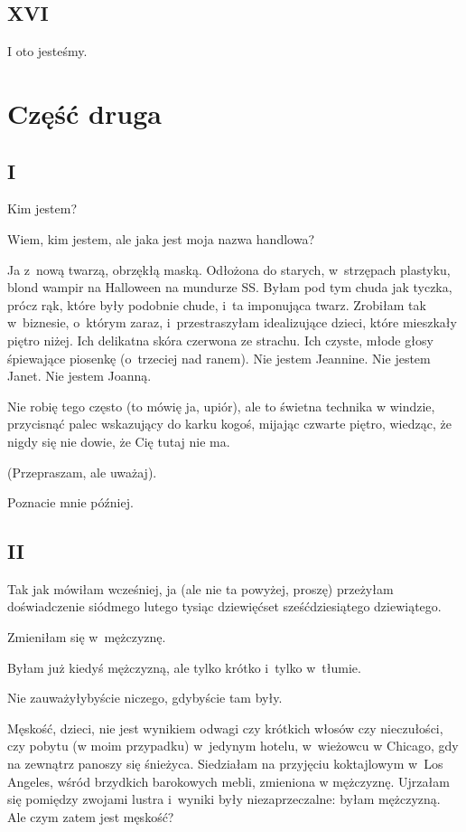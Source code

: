 \documentclass[oneside,polish,12pt,sfheadings]{mwbk}
\begin{document}
\chapter{XVI}

I oto jesteśmy.

\part*{Część druga}

\chapter{I}

Kim jestem?

Wiem, kim jestem, ale jaka jest moja nazwa handlowa?

Ja z~nową twarzą, obrzękłą maską. Odłożona do starych, w~strzępach
plastyku, blond wampir na Halloween na mundurze SS. Byłam pod tym chuda
jak tyczka, prócz rąk, które były podobnie chude, i~ta imponująca
twarz. Zrobiłam tak w~biznesie, o~którym zaraz, i~przestraszyłam idealizujące
dzieci, które mieszkały piętro niżej. Ich delikatna skóra czerwona
ze strachu. Ich czyste, młode głosy śpiewające piosenkę (o~trzeciej
nad ranem). Nie jestem Jeannine. Nie jestem Janet. Nie jestem Joanną.

Nie robię tego często (to mówię ja, upiór), ale to świetna technika
w windzie, przycisnąć palec wskazujący do karku kogoś, mijając czwarte
piętro, wiedząc, że nigdy się nie dowie, że Cię tutaj nie ma.

(Przepraszam, ale uważaj).

Poznacie mnie później.

\chapter{II}

Tak jak mówiłam wcześniej, ja (ale nie ta powyżej, proszę) przeżyłam
doświadczenie siódmego lutego tysiąc dziewięćset sześćdziesiątego
dziewiątego.

Zmieniłam się w~mężczyznę.

Byłam już kiedyś mężczyzną, ale tylko krótko i~tylko w~tłumie.

Nie zauważyłybyście niczego, gdybyście tam były.

Męskość, dzieci, nie jest wynikiem odwagi czy krótkich włosów czy
nieczułości, czy pobytu (w moim przypadku) w~jedynym hotelu, w~wieżowcu
w Chicago, gdy na zewnątrz panoszy się śnieżyca. Siedziałam na przyjęciu
koktajlowym w~Los Angeles, wśród brzydkich barokowych mebli, zmieniona
w mężczyznę. Ujrzałam się pomiędzy zwojami lustra i~wyniki były niezaprzeczalne:
byłam mężczyzną. Ale czym zatem jest męskość?
\end{document}
